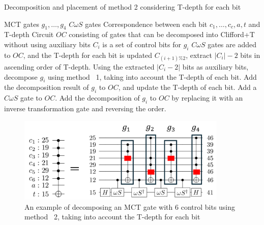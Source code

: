 \begin{algorithm}[tbp]
\caption{Decomposition and placement of method 2 considering T-depth for each bit}
\label{alg:method2_placement_decomp}
\begin{algorithmic}[1]
\Require MCT gates $g_{1},\dots, g_{4}$
\Require $C\omega S$ gates
\Require Correspondence between each bit $c_{1},\dots, c_{c}, a, t$ and T-depth
\Ensure Circuit $OC$ consisting of gates that can be decomposed into Clifford+T without using auxiliary bits
\State $C_{i}$ is a set of control bits for $g_{i}$
\State $C\omega S$ gates are added to $OC$, and the T-depth for each bit is updated
\State $C_{(i+1)\% 2}$, extract $|C_{i}|-2$ bits in ascending order of T-depth.
\State Using the extracted $|C_{i}-2|$ bits as auxiliary bits, decompose $g_{i}$ using method ~1, taking into account the T-depth of each bit.
\State Add the decomposition result of $g_{i}$ to $OC$, and update the T-depth of each bit.
\EndFor
{}
\State Add a $C\omega S$ gate to $OC$.
\State Add the decomposition of $g_{i}$ to $OC$ by replacing it with an inverse transformation gate and reversing the order.
\EndFor
\end{algorithmic}
\end{algorithm}
\par
\begin{figure}
\centering
\includegraphics[width=10cm]{img/mimap_proposed.pdf}
\caption{An example of decomposing an MCT gate with 6 control bits using method ~2, taking into account the T-depth for each bit}
\label{mimap_proposed}
\end{figure}
